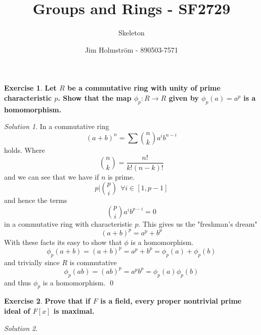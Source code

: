 \documentclass[a4paper,twoside=false,abstract=false,numbers=noenddot,
titlepage=false,headings=small,parskip=half,version=last]{scrartcl}
\author{Jim Holmström - 890503-7571}
\title{Groups and Rings - SF2729}
\subtitle{Skeleton}
\theoremstyle{definition}
\newtheorem{exercise}{Exercise}
\theoremstyle{remark}
\newtheorem*{solution}{Solution}
\begin{document}
\maketitle
\thispagestyle{empty}

\begin{exercise}
{\bf
Let $R$ be a commutative ring with unity of prime characteristic $p$. Show that
the map $\phi_p:R\rightarrow R$ given by $\phi_p(a)=a^p$ is a homomorphism.
}
\end{exercise}
\begin{solution}
In a commutative ring 
\begin{equation}
    (a+b)^n=\sum \binom{n}{k} a^ib^{n-i}
\end{equation}
holds. Where
\begin{equation}
    \binom{n}{k} = \frac{n!}{k!(n-k)!}
\end{equation}
and we can see that we have if $n$ is prime.
\begin{equation}
    p|\binom{p}{i} ~~ \forall i \in \left[1,p-1\right]
\end{equation}
and hence the terms
\begin{equation}
    \binom{p}{i}a^ib^{p-i}=0
\end{equation}
in a commutative ring with characteristic $p$. This gives us the "freshman's dream"
\begin{equation}
    (a+b)^p=a^p+b^p
\end{equation}
With these facts its easy to show that $\phi$ is a homomorphism.
\begin{equation}
    \phi_p(a+b)=(a+b)^p=a^p+b^p=\phi_p(a)+\phi_p(b)
\end{equation}
and trivially since $R$ is commutative
\begin{equation}
    \phi_p(ab)=(ab)^p=a^pb^p=\phi_p(a)\phi_p(b)
\end{equation}
and thus $\phi_p$ is a homomorphism. \qed

\end{solution}

\begin{exercise}
{\bf
Prove that if $F$ is a field, every proper nontrivial prime ideal of
$F\left[x\right]$ is maximal.
}
\end{exercise}
\begin{solution}

\end{solution}

\end{document}
